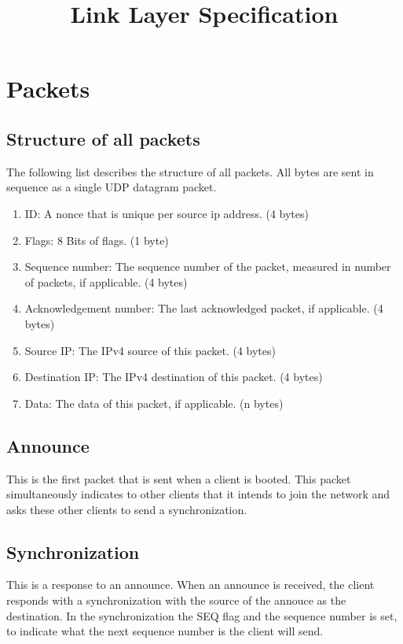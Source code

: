 \documentclass{report}
\title{Link Layer Specification}
\begin{document}
    \maketitle

    \section{Packets}
    \subsection{Structure of all packets}
    The following list describes the structure of all packets. All bytes are sent in sequence as a single UDP datagram packet.

    \begin{enumerate}
        \item ID: A nonce that is unique per source ip address. (4 bytes)
        \item Flags: 8 Bits of flags. (1 byte)
        \item Sequence number: The sequence number of the packet, measured in number of packets, if applicable. (4 bytes)
        \item Acknowledgement number: The last acknowledged packet, if applicable. (4 bytes)
        \item Source IP: The IPv4 source of this packet. (4 bytes)
        \item Destination IP: The IPv4 destination of this packet. (4 bytes)
        \item Data: The data of this packet, if applicable. (n bytes)
    \end{enumerate}
    \subsection{Announce}
    This is the first packet that is sent when a client is booted. This packet simultaneously indicates to other clients that it intends to join the network and asks these other clients to send a synchronization.
    \subsection{Synchronization}
    This is a response to an announce. When an announce is received, the client responds with a synchronization with the source of the annouce as the destination. In the synchronization the SEQ flag and the sequence number is set, to indicate what the next sequence number is the client will send.
\end{document}
